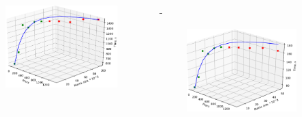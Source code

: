\documentclass[unicode, t, 11pt]{beamer}%
\newlength{\mylen}
\begin{document}
			\begin{frame}
				\footnotesize
				\frametitle{\insertsection}
		 		\framesubtitle{\insertsubsection}
				\begin{columns}[T]
					\setlength{\mylen}{0.5\textwidth}
					\begin{column}{\mylen}
						\begin{figure}
							\captionsetup{font=tiny, labelfont=tiny}
							\centering
							\includegraphics[width=.7\textwidth]{./images/dns_k1}
						\end{figure}
					\end{column}
					\begin{column}{\dimexpr\textwidth-\mylen}
						\begin{figure}
							\captionsetup{font=tiny, labelfont=tiny}
							\centering
							\includegraphics[width=.7\textwidth]{./images/dns_k2}
						\end{figure}
					\end{column}
				\end{columns}

\end{frame}
\end{document}
